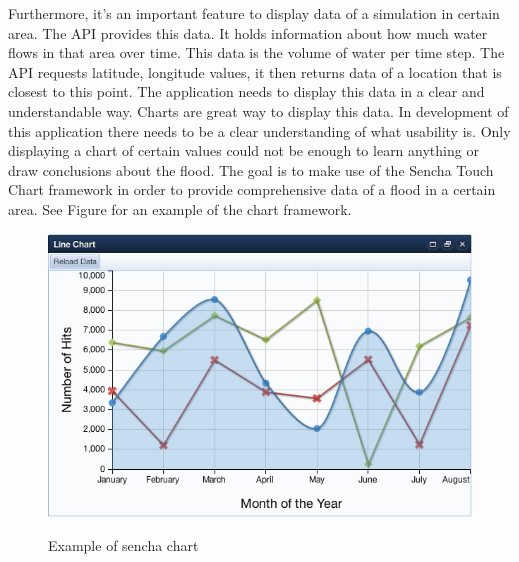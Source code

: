 Furthermore, it's an important feature to display data of a simulation in certain area. The API provides this data. It holds information about how much water flows in that area over time. This data is the volume of water per time step. The API requests latitude, longitude values, it then returns data of a location that is closest to this point. The application needs to display this data in a clear and understandable way. Charts are great way to display this data. In development of this application there needs to be a clear understanding of what usability is. Only displaying a chart of certain values could not be enough to learn anything or draw conclusions about the flood. The goal is to make use of the Sencha Touch Chart framework in order to provide comprehensive data of a flood in a certain area. See Figure \label{fig:senchachart} for an example of the chart framework.

\begin{figure}[H]
\center
	\includegraphics[scale=0.5]{chart.png} \\
\caption{Example of sencha chart}
\label{fig:senchachart}
\end{figure}

